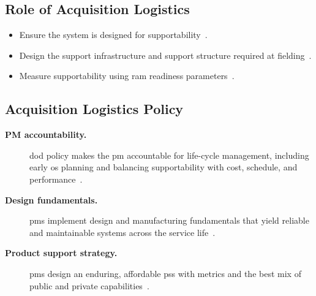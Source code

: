 \documentclass[../main.tex]{subfiles}
\begin{document}
\subsection{Role of Acquisition Logistics}
\begin{itemize}
  \item Ensure the system is designed for supportability~\autocite{edo-3-5-4-acquisition-logistics-2025}.
  \item Design the support infrastructure and support structure required at fielding~\autocite{edo-3-5-4-acquisition-logistics-2025}.
  \item Measure supportability using \ac{ram} readiness parameters~\autocite{edo-3-5-4-acquisition-logistics-2025}.
\end{itemize}

\subsection{Acquisition Logistics Policy}
\begin{description}
  \item[\textbf{PM accountability.}] \ac{dod} policy makes the \ac{pm} accountable for life-cycle management, including early \ac{os} planning and balancing supportability with cost, schedule, and performance~\autocite{edo-3-5-4-acquisition-logistics-2025}.
  \item[\textbf{Design fundamentals.}] \acp{pm} implement design and manufacturing fundamentals that yield reliable and maintainable systems across the service life~\autocite{edo-3-5-4-acquisition-logistics-2025}.
  \item[\textbf{Product support strategy.}] \acp{pm} design an enduring, affordable \ac{pss} with metrics and the best mix of public and private capabilities~\autocite{edo-3-5-4-acquisition-logistics-2025}.
\end{description}
\end{document}

